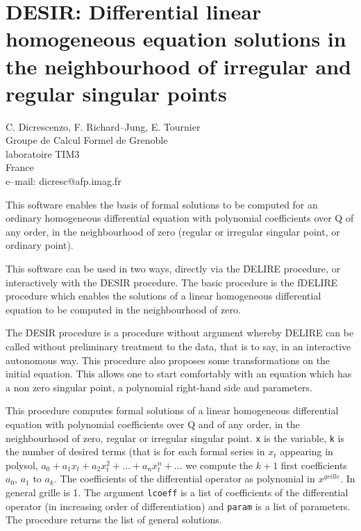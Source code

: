 \chapter[DESIR: Linear Homogeneous DEs]%
        {DESIR: Differential linear homogeneous equation solutions in the
                neighbourhood of irregular and regular singular points}
\label{DESIR}

{\footnotesize
\begin{center}
C. Dicrescenzo, F. Richard--Jung, E. Tournier \\
Groupe de Calcul Formel de Grenoble \\
laboratoire TIM3 \\
France \\[0.05in]
e--mail: dicresc@afp.imag.fr
\end{center}
}


This software enables the basis of formal solutions to be computed for an
ordinary homogeneous differential equation with polynomial coefficients
over Q of any order, in the neighbourhood of zero (regular or irregular
singular point, or ordinary point).

This software can be used in two ways, directly via the \f{DELIRE}
procedure, or interactively with the \f{DESIR} procedure.  The basic
procedure is the f{DELIRE} procedure which enables the solutions of a
linear homogeneous differential equation to be computed in the
neighbourhood of zero.

The \f{DESIR} procedure is a procedure without argument whereby
\f{DELIRE} can be called without preliminary treatment to the data,
that is to say, in an interactive autonomous way. This procedure also
proposes some transformations on the initial equation. This allows one
to start comfortably with an equation which has a non zero singular
point, a polynomial right-hand side and parameters.


This procedure computes formal solutions of a linear homogeneous
differential equation with polynomial coefficients over Q and of any
order, in the neighbourhood of zero, regular or irregular singular
point.  {\tt x} is the variable, {\tt k} is the number of desired
terms (that is for each formal series in $x_t$ appearing in polysol,
$a_0+a_1 x_t+a_2 x_t^2+\ldots + a_n x_t^n+ \ldots$ we compute the
$k+1$ first coefficients $a_0$, $a_1$ to $a_k$.  The coefficients of
the differential operator as polynomial in $x^{grille}$.  In general
grille is 1.  The argument {\tt lcoeff} is a list of coefficients of
the differential operator (in increasing order of differentiation) and
{\tt param} is a list of parameters.  The procedure returns the list
of general solutions.

